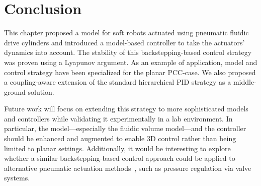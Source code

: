 \section{Conclusion}\label{sec:backstepping:conclusion}
%
This chapter proposed a model for soft robots actuated using pneumatic fluidic drive cylinders and introduced a model-based controller to take the actuators' dynamics into account. The stability of this backstepping-based control strategy was proven using a Lyapunov argument.  As an example of application, model and control strategy have been specialized for the planar \gls{PCC}-case. We also proposed a coupling-aware extension of the standard hierarchical PID strategy as a middle-ground solution.

Future work will focus on extending this strategy to more sophisticated models and controllers while validating it experimentally in a lab environment. In particular, the model—especially the fluidic volume model—and the controller should be enhanced and augmented to enable 3D control rather than being limited to planar settings. Additionally, it would be interesting to explore whether a similar backstepping-based control approach could be applied to alternative pneumatic actuation methods~\citep{franco2024model}, such as pressure regulation via valve systems.